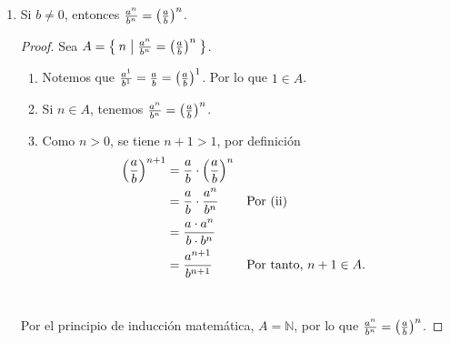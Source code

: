\documentclass[11pt]{article}
\newcommand{\N}{\mathbb{N}}
\let\set\Set
\begin{document}
\begin{enumerate}[label=\alph*)]
\begin{proof}
\begin{enumerate}[label=\roman*)]
  Como $m>0$, sigue que $m+1>1$, por lo que $a^{m+1}=a\cdot a^m=a^m\cdot a^1$, lo que implica que $1\in A$.
 \item Si $n\in A$, tenemos que $a^{m+n}=a^m\cdot a^n$.
 \item Por definición \begin{align*}
  a^{m+(n+1)} = \left\{
   \begin{array}{@{}r@{\thinspace}l}
    a, &  \ \text{si}  \ m+(n+1) = 1\\
    a\cdot a^{m+n}, &  \ \text{si}  \ m+(n+1) > 1
   \end{array} \right.
  \end{align*}

 Como $m+n>0$, sigue que $m+(n+1)>1$. Por tanto, \begin{align*}
  a^{m+(n+1)} &=a\cdot a^{m+n} && \text{Definición}\\
  &= a\cdot a^m \cdot a^n && \text{Por (ii)}\\
  &= a^m \cdot a^{n+1} && \text{Por (i)}
 \end{align*}
 \end{enumerate}

 Por el principio de inducción matemática, $A=\N$, por lo que $a^m \cdot a^n = a^{m+n}, \forall m,n\in \N$.
 \end{proof}

 \item Si $b\neq 0$, entonces $\frac{a^n}{b^n}= \qty(\frac{a}{b})^n$.
 \begin{proof}
 Sea $A=\set{n|\frac{a^n}{b^n}= \qty(\frac{a}{b})^n}$.
 \begin{enumerate}[label=\roman*)]
 \item Notemos que $\frac{a^1}{b^1}= \frac{a}{b}= \qty(\frac{a}{b})^1$. Por lo que $1\in A$.
 \item Si $n\in A$, tenemos $\frac{a^n}{b^n}= \qty(\frac{a}{b})^n$.
 \item Como $n>0$, se tiene $n+1>1$, por definición
  \begin{align*}
    \qty(\frac{a}{b})^{n+1} &= \frac{a}{b}\cdot \qty(\frac{a}{b})^n\\
    &=\frac{a}{b}\cdot \frac{a^n}{b^n} && \text{Por (ii)}\\
    &= \frac{a\cdot a^n}{b\cdot b^n}\\
    &= \frac{a^{n+1}}{b^{n+1}} && \text{Por tanto, $n+1\in A$.}
   \end{align*}\
 \end{enumerate}
 Por el principio de inducción matemática, $A=\N$, por lo que $\frac{a^n}{b^n}= \qty(\frac{a}{b})^n$.
 \end{proof}


\end{enumerate}
\end{document}
